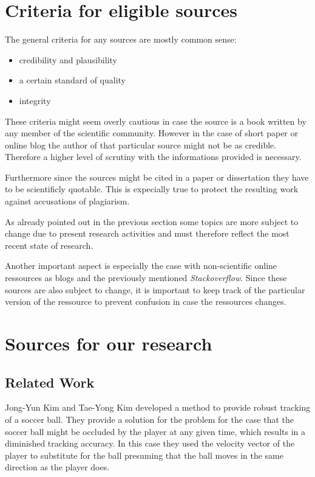 \documentclass[titlepage, a4paper, 11pt]{scrartcl}
\begin{document}
\section{Criteria for eligible sources}

The general criteria for any sources are mostly common sense:

\begin{itemize}
    \item credibility and plausibility
    \item a certain standard of quality
    \item integrity
\end{itemize}

These criteria might seem overly cautious in case the source is a book written by any member of the scientific community. However in the case of short paper or online blog
the author of that particular source might not be as credible. Therefore a higher level of scrutiny with the informations provided is necessary.

Furthermore since the sources might be cited in a paper or dissertation they have to be scientificly quotable. This is expecially true to protect the resulting work against 
accusations of plagiarism.

As already pointed out in the previous section some topics are more subject to change due to present research activities
and must therefore reflect the most recent state of research. 

Another important aspect is especially the case with non-scientific online ressources as blogs and the previously mentioned
\textit{Stackoverflow}. Since these sources are also subject to change, it is important to keep track of the particular
version of the ressource to prevent confusion in case the ressources changes.

\section{Sources for our research}

\subsection{Related Work}

Jong-Yun Kim and Tae-Yong Kim \cite{kim} developed a method to provide robust tracking of a soccer ball. 
They provide a solution for the problem for the case that the soccer ball might be occluded by the player at any given time,
which results in a diminished tracking accuracy. 
In this case they used the velocity vector of the player to substitute for the ball presuming that the ball moves in the same direction as the player does.
\end{document}

